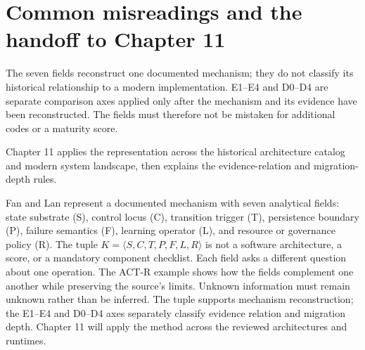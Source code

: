 \section{Common misreadings and the handoff to Chapter 11}
\label{sec:chapter10-common-misreadings}

The seven fields reconstruct one documented mechanism; they do not classify its historical relationship to a modern implementation. E1--E4 and D0--D4 are separate comparison axes applied only after the mechanism and its evidence have been reconstructed. The fields must therefore not be mistaken for additional codes or a maturity score.

Chapter 11 applies the representation across the historical architecture catalog and modern system landscape, then explains the evidence-relation and migration-depth rules.

\begin{chapterrecap}
Fan and Lan represent a documented mechanism with seven analytical fields: state substrate (S), control locus (C), transition trigger (T), persistence boundary (P), failure semantics (F), learning operator (L), and resource or governance policy (R). The tuple \(K=\langle S,C,T,P,F,L,R\rangle\) is not a software architecture, a score, or a mandatory component checklist. Each field asks a different question about one operation. The ACT-R example shows how the fields complement one another while preserving the source's limits. Unknown information must remain unknown rather than be inferred. The tuple supports mechanism reconstruction; the E1--E4 and D0--D4 axes separately classify evidence relation and migration depth. Chapter 11 will apply the method across the reviewed architectures and runtimes.
\end{chapterrecap}

